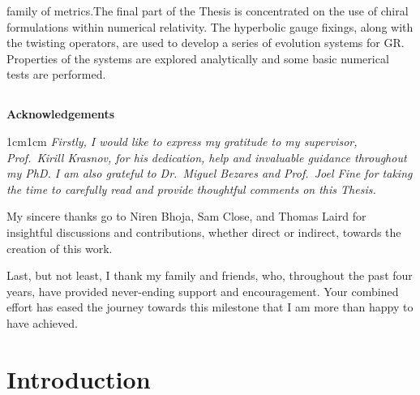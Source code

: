 \documentclass[10pt]{report}
\newcommand{\blankpage}{\newpage \pagestyle{empty}\mbox{} \newpage}
\theoremstyle{definition}
\begin{document}
family of metrics.\newline\indent The final part of the Thesis is concentrated on the use of chiral formulations within numerical relativity. The hyperbolic gauge fixings, along with the twisting operators, are used to develop a series of evolution systems for GR. Properties of the systems are explored analytically and some basic numerical tests are performed.

    \setlength\parindent{0pt}

    \blankpage
\section*{}
\vfill
\begin{center}
	{\bfseries\LARGE Acknowledgements}
\end{center}
\vspace{20pt}
\begin{center}
\begin{adjustwidth}{1cm}{1cm}
\it
Firstly, I would like to express my gratitude to my supervisor, Prof.~Kirill Krasnov, for his dedication, help and invaluable guidance throughout my PhD. I am also grateful to Dr.~Miguel Bezares and Prof.~Joel Fine for taking the time to carefully read and provide thoughtful comments on this Thesis.

My sincere thanks go to Niren Bhoja, Sam Close, and Thomas Laird for insightful discussions and contributions, whether direct or indirect, towards the creation of this work. 

Last, but not least, I thank my family and friends, who, throughout the past four years, have provided never-ending support and encouragement. Your combined effort has eased the journey towards this milestone that I am more than happy to have achieved.
\end{adjustwidth}
\end{center}
\vfill

    \blankpage
        
    \newpage 
    \begingroup
    \hypersetup{linkcolor=black}
    \tableofcontents
    \endgroup

    \blankpage

\chapter{Introduction}
\end{document}
